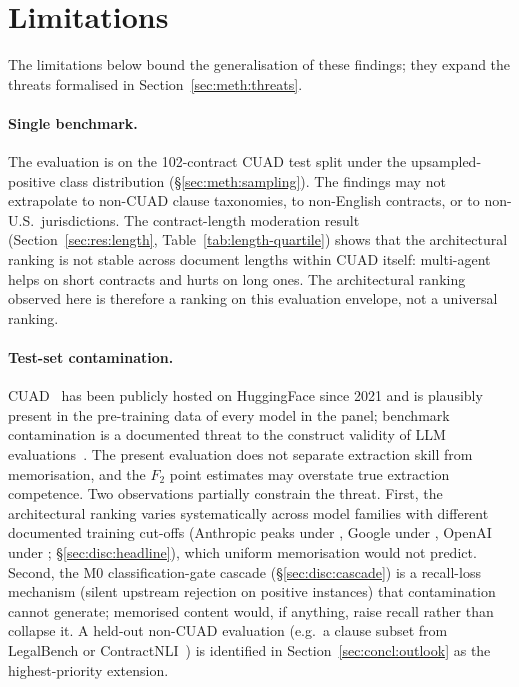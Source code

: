 \section{Limitations}\label{sec:concl:limitations}

The limitations below bound the generalisation of these findings; they
expand the threats formalised in Section~\ref{sec:meth:threats}.

\paragraph{Single benchmark.}
The evaluation is on the 102-contract CUAD test split under the upsampled-positive
class distribution (\S\ref{sec:meth:sampling}). The findings may not extrapolate
to non-CUAD clause taxonomies, to non-English contracts, or to non-U.S.\
jurisdictions.
The contract-length moderation result
(Section~\ref{sec:res:length}, Table~\ref{tab:length-quartile}) shows that
the architectural ranking is not stable across document lengths within CUAD
itself: multi-agent helps on short contracts and hurts on long ones.
The architectural ranking observed here is therefore a ranking on this
evaluation envelope, not a universal ranking.

\paragraph{Test-set contamination.}
CUAD~\cite{hendrycks2021cuad} has been publicly hosted on HuggingFace since
2021 and is plausibly present in the pre-training data of every model in the
panel; benchmark contamination is a documented threat to the construct
validity of LLM evaluations~\cite{sainz2023nlp,magar2022data}. The present
evaluation does not separate extraction skill from memorisation, and the
$F_2$ point estimates may overstate true extraction competence. Two
observations partially constrain the threat. First, the architectural
ranking varies systematically across model families with different
documented training cut-offs (Anthropic peaks under \cfgCoT, Google under
\cfgZS, OpenAI under \cfgCX; \S\ref{sec:disc:headline}), which uniform
memorisation would not predict. Second, the M0 classification-gate cascade
(\S\ref{sec:disc:cascade}) is a recall-loss mechanism (silent upstream
rejection on positive instances) that contamination cannot generate;
memorised content would, if anything, raise recall rather than collapse it.
A held-out non-CUAD evaluation (e.g.\ a clause subset from
LegalBench or ContractNLI~\cite{koreeda2021contractnli}) is identified in
Section~\ref{sec:concl:outlook} as the highest-priority extension.

